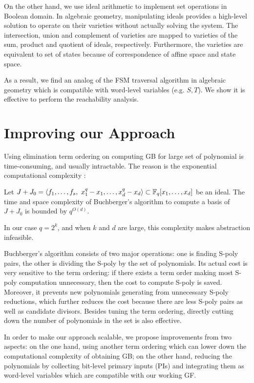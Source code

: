 
On the other hand, we use ideal arithmetic to implement set operations in Boolean domain.
In algebraic geometry, manipulating ideals provides a high-level solution to 
operate on their varieties without actually solving the system. The intersection, union and 
complement of varieties are mapped to varieties of the sum, product and quotient of ideals, respectively.
Furthermore, the varieties are equivalent to set of states because of correspondence of 
affine space and state space.

As a result, we find an analog of the FSM traversal algorithm in algebraic geometry which is 
compatible with word-level variables (e.g. $S,T$). We show it is effective to perform the 
reachability analysis.

\section{Improving our Approach}
\label{sec:improve}

Using elimination term ordering on computing GB for large set of polynomial is time-consuming, and usually 
intractable. The reason is the exponential computational complexity \cite{gao:gf-gb-ms}:
\begin{Theorem}
Let $J+J_0 = \langle f_1, \dots, f_s, ~x_1^q - x_1, \dots, x_d^q -
x_d\rangle \subset {\mathbb{F}}_{q} [x_1, \dots, x_d]$ be an ideal. The time and
space complexity of Buchberger's algorithm to compute a \Grobner
basis of $J+J_0$ is bounded by $q^{O(d)}$.
\end{Theorem}

In our case $q = 2^k$, and when $k$ and $d$ are large, this complexity 
makes abstraction infeasible.

Buchberger's algorithm consists of two major operations: one is finding 
S-poly pairs, the other is dividing the S-poly by the set of polynomials.
Its actual cost is very sensitive to the term ordering: if there exists 
a term order making most S-poly computation unnecessary, then the cost to 
compute S-poly is saved. Moreover, it prevents new polynomials generating 
from unnecessary S-poly reductions, which further reduces the cost
because there are less S-poly pairs as well as candidate divisors.
Besides tuning the term ordering, directly cutting down the number of 
polynomials in the set is also effective.

In order to make our approach scalable, we propose improvements from 
two aspects: on the one hand, using another term ordering which can lower down the 
computational complexity of obtaining GB; on the other hand, reducing the 
polynomials by collecting bit-level primary inputs (PIs) and integrating them as word-level 
variables which are compatible with our working GF.

